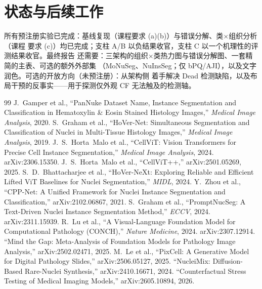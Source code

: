 \documentclass[11pt]{article}
\begin{document}
\section{状态与后续工作}
\label{sec:status}

所有预注册实验已完成：基线复现（课程要求 (a)(b)）与错误分解、类$\times$组织分析（课程
要求 (c)）均已完成；支柱 A/B 以负结果收官，支柱 C 以一个机理性的评测结果收官。最终报告
还需要：三架构的组织$\times$类热力图与错误分解图、一套精简的主表、可选的额外外部集
（MoNuSeg、NuInsSeg；仅 bPQ/AJI），以及文字润色。可选的开放方向（未预注册）：从架构侧
着手解决 Dead 检测缺陷，以及布局干预的反事实——用于探测仅外观 CF 无法触及的检测轴。

\begin{thebibliography}{99}\small
{} J.~Gamper et al., ``PanNuke Dataset Name, Instance Segmentation and
Classification in Hematoxylin \& Eosin Stained Histology Images,'' \emph{Medical Image Analysis},
2020.
 S.~Graham et al., ``HoVer-Net: Simultaneous Segmentation and
Classification of Nuclei in Multi-Tissue Histology Images,'' \emph{Medical Image Analysis}, 2019.
 J.~S.~Horta~Malo et al., ``CellViT: Vision Transformers for Precise
Cell Instance Segmentation,'' \emph{Medical Image Analysis}, 2024. arXiv:2306.15350.
 J.~S.~Horta~Malo et al., ``CellViT++,'' arXiv:2501.05269, 2025.
 S.~D.~Bhattacharjee et al., ``HoVer-NeXt: Exploring Reliable and Efficient
Lifted ViT Baselines for Nuclei Segmentation,'' \emph{MIDL}, 2024.
 Y.~Zhou et al., ``CPP-Net: A Unified Framework for Nuclei Instance Segmentation
and Classification,'' arXiv:2102.06867, 2021.
 S.~Graham et al., ``PromptNucSeg: A Text-Driven Nuclei Instance
Segmentation Method,'' \emph{ECCV}, 2024. arXiv:2311.15939.
 R.~Lu et al., ``A Visual-Language Foundation Model for Computational
Pathology (CONCH),'' \emph{Nature Medicine}, 2024. arXiv:2307.12914.
 ``Mind the Gap: Meta-Analysis of Foundation Models for Pathology Image
Analysis,'' arXiv:2502.02471, 2025.
 M.~Le et al., ``PixCell: A Generative Model for Digital Pathology
Slides,'' arXiv:2506.05127, 2025.
 ``NucleiMix: Diffusion-Based Rare-Nuclei Synthesis,'' arXiv:2410.16671, 2024.
 ``Counterfactual Stress Testing of Medical Imaging Models,'' arXiv:2605.10894, 2026.
\end{thebibliography}
\end{document}
